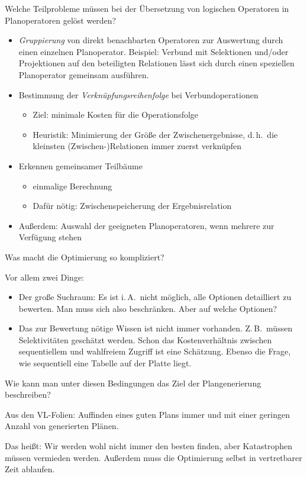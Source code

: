 	\item Welche Teilprobleme müssen bei der Übersetzung von logischen Operatoren in Planoperatoren gelöst werden?

\begin{solution}
\begin{itemize}
	\item \textit{Gruppierung} von direkt benachbarten Operatoren zur Auswertung durch einen einzelnen Planoperator.
	Beispiel: Verbund mit Selektionen und/oder Projektionen auf den beteiligten Relationen lässt sich durch einen speziellen Planoperator gemeinsam ausführen.
	\item Bestimmung der \textit{Verknüpfungsreihenfolge} bei Verbundoperationen
		\begin{itemize}
			\item Ziel: minimale Kosten für die Operationsfolge
			\item Heuristik: Minimierung der Größe der Zwischenergebnisse,
        d.\,h.\ die kleinsten (Zwischen-)Relationen immer zuerst verknüpfen
		\end{itemize}
	\item Erkennen gemeinsamer Teilbäume
		\begin{itemize}
			\item einmalige Berechnung
			\item Dafür nötig: Zwischenspeicherung der Ergebnisrelation
		\end{itemize}
	\item Außerdem: Auswahl der geeigneten Planoperatoren, wenn mehrere zur Verfügung stehen
	\end{itemize}
\end{solution}

	\item Was macht die Optimierung so kompliziert?

\begin{solution}
Vor allem zwei Dinge:
\begin{itemize}
	\item Der große Suchraum: Es ist i.\,A.\ nicht möglich, alle Optionen detailliert zu bewerten. Man muss sich also beschränken. Aber auf welche Optionen?
	\item Das zur Bewertung nötige Wissen ist nicht immer vorhanden. Z.\,B.\ müssen Selektivitäten geschätzt werden. Schon das Kostenverhältnis zwischen sequentiellem und wahlfreiem Zugriff ist eine Schätzung. Ebenso die Frage, wie sequentiell eine Tabelle auf der Platte liegt.
\end{itemize}
\end{solution}

	\item Wie kann man unter diesen Bedingungen das Ziel der Plangenerierung beschreiben?

\begin{solution}
Aus den VL-Folien: Auffinden eines guten Plans immer und mit einer geringen Anzahl von generierten Plänen.

Das heißt: Wir werden wohl nicht immer den besten finden, aber Katastrophen müssen vermieden werden. Außerdem muss die Optimierung selbst in vertretbarer Zeit ablaufen.
\end{solution}
